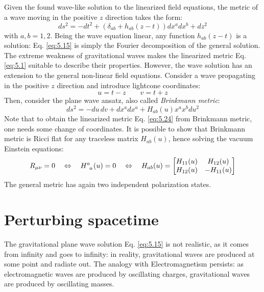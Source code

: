 Given the found wave-like solution to the linearized field equations, the metric of a wave moving in the positive $ z $ direction takes the form:
\begin{equation}
  ds^2 = -dt^2 + \left( \delta_{ab} + h_{ab}(z - t) \right) dx^a dx^b + dz^2
  \label{eq:5.24}
\end{equation}
with $ a,b = 1,2 $. Being the wave equation linear, any function $ h_{ab}(z - t) $ is a solution: Eq. \ref{eq:5.15} is simply the Fourier decomposition of the general solution.\\
The extreme weakness of gravitational waves makes the linearized metric Eq. \ref{eq:5.1} suitable to describe their properties. However, the wave solution has an extension to the general non-linear field equations. Consider a wave propagating in the positive $ z $ direction and introduce lightcone coordinates:
\begin{equation*}
  u = t - z
  \qquad
  v = t + z
\end{equation*}
Then, consider the plane wave ansatz, also called \textit{Brinkmann metric}:
\begin{equation*}
  ds^2 = -du\,dv + dx^a dx^a + H_{ab}(u) x^a x^b du^2
\end{equation*}
Note that to obtain the linearized metric Eq. \ref{eq:5.24} from Brinkmann metric, one needs some change of coordinates. It is possible to show that Brinkmann metric is Ricci flat for any traceless matrix $ H_{ab}(u) $, hence solving the vacuum Einstein equations:
\begin{equation*}
  R_{\mu \nu} = 0 \quad \Leftrightarrow \quad \tensor{H}{^a_a}(u) = 0 \quad \Leftrightarrow \quad H_{ab}(u) =
  \begin{bmatrix}
    H_{11}(u) & H_{12}(u) \\
    H_{12}(u) & -H_{11}(u)
  \end{bmatrix}
\end{equation*}
The general metric has again two independent polarization states.

\section{Perturbing spacetime}

The gravitational plane wave solution Eq. \ref{eq:5.15} is not realistic, as it comes from infinity and goes to infinity: in reality, gravitational waves are produced at some point and radiate out. The analogy with Electromagnetism persists: as electromagnetic waves are produced by oscillating charges, gravitational waves are produced by oscillating masses.

